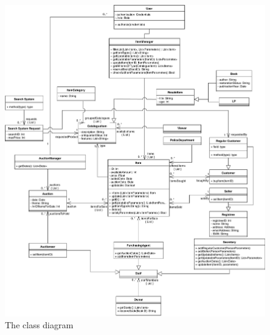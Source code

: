 \begin{landscape}
\begin{figure}[H]
	\centering
	\includegraphics[scale=.85]{uml/classdiagramUPD3.pdf}
	\caption*{The class diagram}
\end{figure}
\end{landscape}


